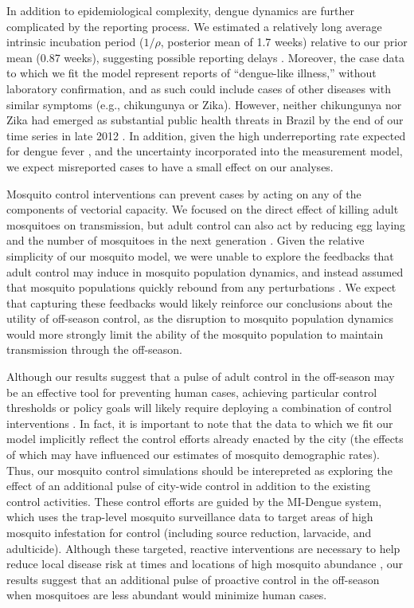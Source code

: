 \documentclass[10pt,letterpaper]{article}
\begin{document}
In addition to epidemiological complexity, dengue dynamics are further complicated by the reporting process.
We estimated a relatively long average intrinsic incubation period ($1/\rho$, posterior mean of 1.7 weeks) relative to our prior mean (0.87 weeks), suggesting possible reporting delays \cite{Reich2016}.
Moreover, the case data to which we fit the model represent reports of ``dengue-like illness,'' without laboratory confirmation, and as such could include cases of other diseases with similar symptoms (e.g., chikungunya or Zika).
However, neither chikungunya nor Zika had emerged as substantial public health threats in Brazil by the end of our time series in late 2012 \cite{PAHO2014, PAHO2015}.
In addition, given the high underreporting rate expected for dengue fever \cite{Silva2016}, and the uncertainty incorporated into the measurement model, we expect misreported cases to have a small effect on our analyses.

Mosquito control interventions can prevent cases by acting on any of the components of vectorial capacity.
We focused on the direct effect of killing adult mosquitoes on transmission, but adult control can also act by reducing egg laying and the number of mosquitoes in the next generation \cite{Brady2016}.
Given the relative simplicity of our mosquito model, we were unable to explore the feedbacks that adult control may induce in mosquito population dynamics, and instead assumed that mosquito populations quickly rebound from any perturbations \cite{Focks1987}.
We expect that capturing these feedbacks would likely reinforce our conclusions about the utility of off-season control, as the disruption to mosquito population dynamics would more strongly limit the ability of the mosquito population to maintain transmission through the off-season.

Although our results suggest that a pulse of adult control in the off-season may be an effective tool for preventing human cases, achieving particular control thresholds or policy goals will likely require deploying a combination of control interventions \cite{Brady2016}.
In fact, it is important to note that the data to which we fit our model implicitly reflect the control efforts already enacted by the city (the effects of which may have influenced our estimates of mosquito demographic rates).
Thus, our mosquito control simulations should be interepreted as exploring the effect of an additional pulse of city-wide control in addition to the existing control activities.
These control efforts are guided by the MI-Dengue system, which uses the trap-level mosquito surveillance data to target areas of high mosquito infestation for control (including source reduction, larvacide, and adulticide)\cite{Eiras2009}.
Although these targeted, reactive interventions are necessary to help reduce local disease risk at times and locations of high mosquito abundance \cite{Pepin2013}, our results suggest that an additional pulse of proactive control in the off-season when mosquitoes are less abundant would minimize human cases. 
\end{document}
